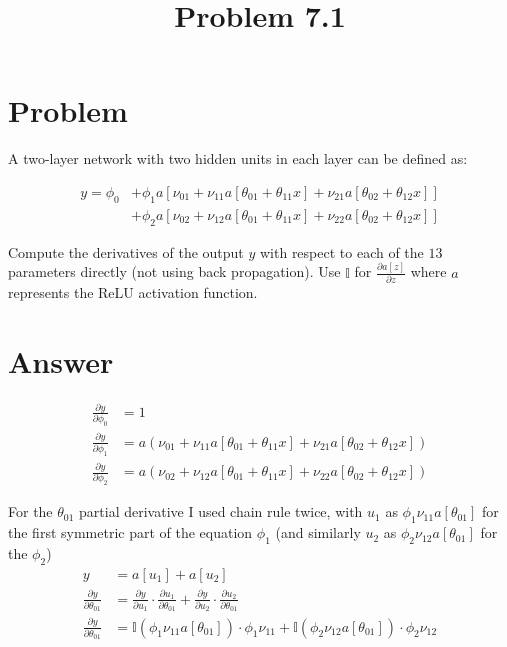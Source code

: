 \documentclass{article}
\title{Problem 7.1}
\begin{document}
\maketitle

\section{Problem}

A two-layer network with two hidden units in each layer can be defined as:

\begin{align*}
    y = \phi_{0}
    &+ \phi_{1}a
     \left[
        \nu_{01}
        + \nu_{11}a[\theta_{01} + \theta_{11}x]
        + \nu_{21}a[\theta_{02} + \theta_{12}x]
      \right]
      \\
    &+ \phi_{2}a
    \left[
        \nu_{02}
        + \nu_{12}a[\theta_{01} + \theta_{11}x]
        + \nu_{22}a[\theta_{02} + \theta_{12}x]
    \right]
\end{align*}

Compute the derivatives of the output $y$ with respect to each of the $13$ parameters directly (not using back propagation).  Use $\mathbb{I}$ for $ \frac{\partial{a[z]}}{\partial{z}}$ where $a$ represents the ReLU activation function.

\section{Answer}

\begin{align*}
    \frac{\partial{y}}{\partial{\phi_{0}}} &=
    1
    \\
    \frac{\partial{y}}{\partial{\phi_{1}}} &=
    a
    (
        \nu_{01}
        + \nu_{11}a[\theta_{01} + \theta_{11}x]
        + \nu_{21}a[\theta_{02} + \theta_{12}x]
    ) 
    \\
    \frac{\partial{y}}{\partial{\phi_{2}}} &=
    a
    (
        \nu_{02}
        + \nu_{12}a[\theta_{01} + \theta_{11}x]
        + \nu_{22}a[\theta_{02} + \theta_{12}x]
    ) 
\end{align*}

For the $\theta_{01}$ partial derivative I used chain rule twice, with $u_{1}$ as $\phi_{1}\nu_{11}a[\theta_{01}]$ for the first symmetric part of the equation $\phi_{1}$ (and similarly $u_{2}$ as  $\phi_{2}\nu_{12}a[\theta_{01}]$ for the $\phi_{2}$)
\begin{align*}
    y &= a[u_{1}] + a[u_{2}]
    \\
    \frac{\partial{y}}{\partial{\theta_{01}}} &=
    \frac{\partial{y}}{\partial{u_{1}}} \cdot \frac{\partial{u_{1}}}{\partial{\theta_{01}}} +  
    \frac{\partial{y}}{\partial{u_{2}}} \cdot \frac{\partial{u_{2}}}{\partial{\theta_{01}}}
    \\
    \frac{\partial{y}}{\partial{\theta_{01}}} &=
    \mathbb{I}(\phi_{1}\nu_{11}a[\theta_{01}]) \cdot \phi_{1}\nu_{11} + \mathbb{I}(\phi_{2}\nu_{12}a[\theta_{01}]) \cdot \phi_{2}\nu_{12}
\end{align*}
\end{document}
